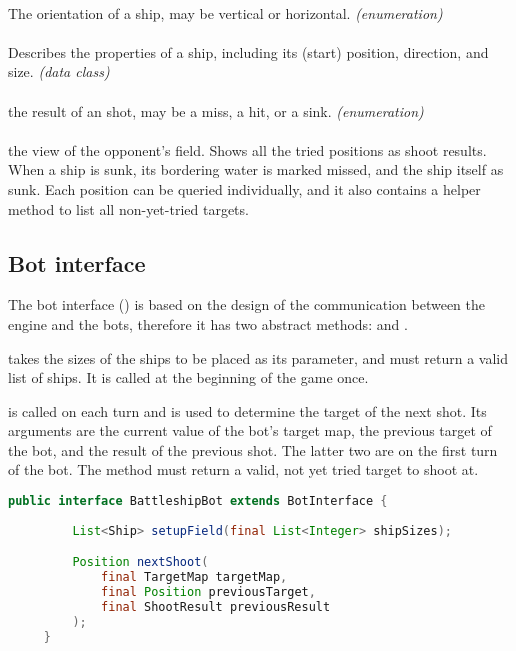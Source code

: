 				\paragraph{} The orientation of a ship, may be vertical or horizontal. \emph{(enumeration)}
				
				\paragraph{} Describes the properties of a ship, including its (start) position, direction, and size. \emph{(data class)}
				
				\paragraph{} the result of an shot, may be a miss, a hit, or a sink. \emph{(enumeration)}
				
				\paragraph{} the view of the opponent's field. Shows all the tried positions as shoot results. When a ship is sunk, its bordering water is marked missed, and the ship itself as sunk. Each position can be queried individually, and it also contains a helper method to list all non-yet-tried targets.
			
			\subsection{Bot interface}
			
			The bot interface () is based on the design of the communication between the engine and the bots, therefore it has two abstract methods:  and .

			 takes the sizes of the ships to be placed as its parameter, and must return a valid list of ships. It is called at the beginning of the game once.
			
			 is called on each turn and is used to determine the target of the next shot. Its arguments are the current value of the bot's target map, the previous target of the bot, and the result of the previous shot. The latter two are  on the first turn of the bot. The method must return a valid, not yet tried target to shoot at.
		
			\begin{center}
				\begin{minipage}{13cm}
		\begin{lstlisting}[language=Java, title={\code{BattleshipBot.java}}]
	 public interface BattleshipBot extends BotInterface {
	    
	     List<Ship> setupField(final List<Integer> shipSizes);

	 	 Position nextShoot(
	 		 final TargetMap targetMap,
			 final Position previousTarget,
    		 final ShootResult previousResult
		 );
	 }
		\end{lstlisting}
				\end{minipage}
			\end{center}
		
